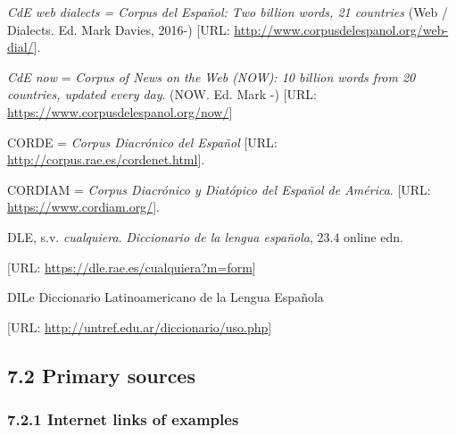 \documentclass[output=paper]{langscibook}
\begin{document}
\textit{CdE web dialects = Corpus del Español: Two billion words, 21 countries} (Web / Dialects. Ed. Mark Davies, 2016-) [URL: \url{http://www.corpusdelespanol.org/web-dial/}].

\textit{CdE now} = \textit{Corpus of News on the Web (NOW): 10 billion words from 20 countries, updated every day}. (NOW. Ed. Mark \citealt{Davies2016}-) [URL: \url{https://www.corpusdelespanol.org/now/}]

CORDE = \textit{Corpus Diacrónico del Español} [URL: \url{http://corpus.rae.es/cordenet.html}]. 

CORDIAM = \textit{Corpus Diacrónico y Diatópico del Español de América}. [URL: \url{https://www.cordiam.org/}].

DLE, s.v. \textit{cualquiera}. \textit{Diccionario de la lengua española}, 23.4 online edn. 

  [URL: \url{https://dle.rae.es/cualquiera?m=form}{]}

DILe Diccionario Latinoamericano de la Lengua Española 

  [URL: \url{http://untref.edu.ar/diccionario/uso.php}]

\subsection{7.2 Primary sources}
\subsubsection{7.2.1 Internet links of examples}
\end{document}
